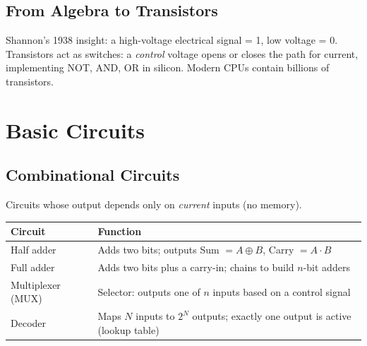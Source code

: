 \documentclass[oneside]{book}
\begin{document}


\subsection*{From Algebra to Transistors}

Shannon's 1938 insight: a high-voltage electrical signal = 1, low voltage = 0.
Transistors act as switches: a \emph{control} voltage opens or closes the path for
current, implementing NOT, AND, OR in silicon.  Modern CPUs contain billions of
transistors.

\section{Basic Circuits}

\subsection*{Combinational Circuits}

Circuits whose output depends only on \emph{current} inputs (no memory).

\begin{center}
\begin{tabularx}{\linewidth}{lX}
\toprule
\textbf{Circuit} & \textbf{Function} \\
\midrule
Half adder & Adds two bits; outputs Sum $= A \oplus B$, Carry $= A \cdot B$ \\
Full adder & Adds two bits plus a carry-in; chains to build $n$-bit adders \\
Multiplexer (MUX) & Selector: outputs one of $n$ inputs based on a control signal \\
Decoder & Maps $N$ inputs to $2^N$ outputs; exactly one output is active (lookup table) \\
\bottomrule
\end{tabularx}
\end{center}
\end{document}
